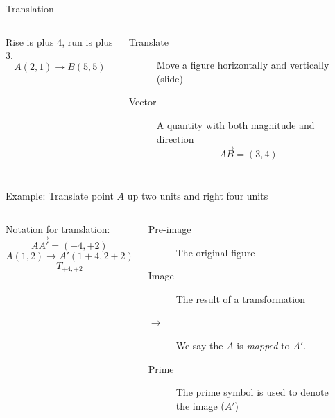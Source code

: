 \begin{frame}{Translation}
    \begin{columns}
      Rise is plus 4, run is plus 3. \\
      $$A(2,1) \rightarrow B(5,5)$$
      \begin{description}
        \item[Translate] Move a figure horizontally and vertically (slide)
        \item[Vector] A quantity with both magnitude and direction 
        $$\overrightarrow{AB}=(3,4)$$
      \end{description}
      \begin{flushright}
      \end{flushright}
    \end{columns}
  \end{frame}

\begin{frame}{Example: Translate point $A$ up two units and right four units}
    \begin{columns}
        Notation for translation: \\
        $$\overrightarrow{AA'}=(+4,+2)$$
        $$A(1,2) \rightarrow A'(1+4,2+2)$$
        $$T_{+4,+2}$$
        \begin{description}
            \item[Pre-image] The original figure
            \item[Image] The result of a transformation
            \item[$\rightarrow$] We say the $A$ is \emph{mapped} to $A'$.
            \item[Prime] The prime symbol is used to denote the image ($A'$)
          \end{description}
    \begin{flushright}
    \end{flushright}
\end{columns}
\end{frame}

